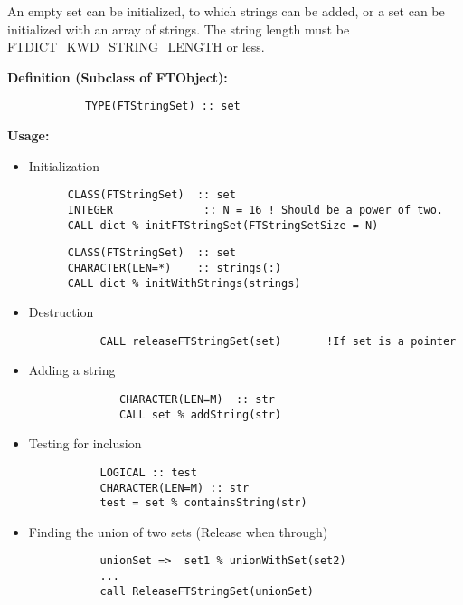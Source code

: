 \documentclass[9pt]{article}
\begin{document}
An empty set can be initialized, to which strings can be added, or a set can be initialized with an array of strings. The
string length must be FTDICT\_KWD\_STRING\_LENGTH or less.

     {\bf Definition (Subclass of FTObject):}
	{\color{blue}\begin{verbatim}
        	TYPE(FTStringSet) :: set
	\end{verbatim}}
     {\bf Usage:}

\begin{itemize}
        \item Initialization
	{\color{blue}\begin{verbatim}
      CLASS(FTStringSet)  :: set
      INTEGER              :: N = 16 ! Should be a power of two.
      CALL dict % initFTStringSet(FTStringSetSize = N)
	\end{verbatim}}

	{\color{blue}\begin{verbatim}
      CLASS(FTStringSet)  :: set
      CHARACTER(LEN=*)    :: strings(:)
      CALL dict % initWithStrings(strings)
	\end{verbatim}}
	
        \item Destruction
		{\color{blue}\begin{verbatim}
           CALL releaseFTStringSet(set)       !If set is a pointer
	\end{verbatim}}
	
        \item Adding a string

	{\color{blue}\begin{verbatim}
              CHARACTER(LEN=M)  :: str
              CALL set % addString(str)
	\end{verbatim}}
	
        \item Testing for inclusion

	{\color{blue}\begin{verbatim}
           LOGICAL :: test
           CHARACTER(LEN=M) :: str
           test = set % containsString(str)
	\end{verbatim}}
	
        \item Finding the union of two sets (Release when through)
	{\color{blue}\begin{verbatim}
           unionSet =>  set1 % unionWithSet(set2)
           ...
           call ReleaseFTStringSet(unionSet)
	\end{verbatim}}
	

\end{itemize}
\end{document}

